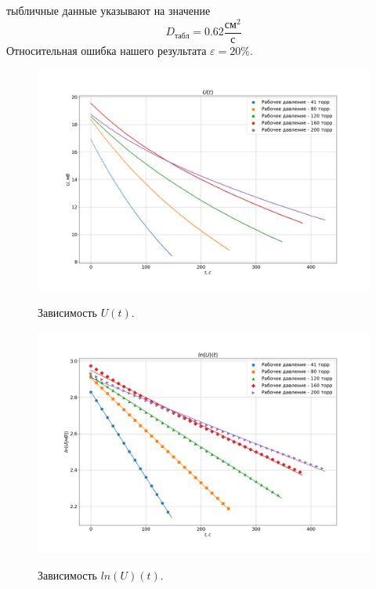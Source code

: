 \documentclass{article}
\begin{document}
    тыбличные данные указывают на значение
    \[D_{табл} = 0.62\frac{см^2}{с}\]
    Относительная ошибка нашего результата $\varepsilon = 20\%$.
    \newpage
    \begin{figure}
        \includegraphics[width=1.2\textwidth]{U(t)}
        \label{U}
        \caption{Зависимость $U(t)$.}
    \end{figure}
    \newpage
    \begin{figure}
        \includegraphics[width=1.2\textwidth]{lnU(t)_mnk}
        \label{lnU}
        \caption{Зависимость $ln(U)(t)$.}
    \end{figure}
    \newpage
\end{document}
